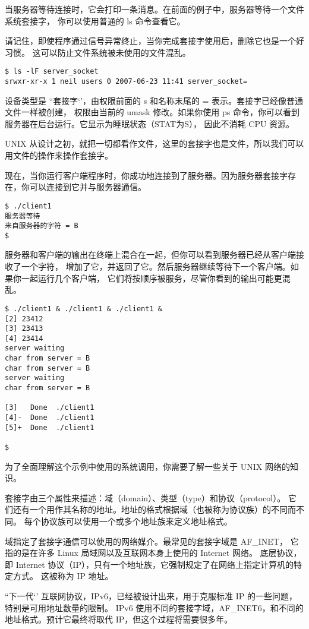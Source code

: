 \documentclass{ctexart}
\begin{document}
当服务器等待连接时，它会打印一条消息。在前面的例子中，服务器等待一个文件系统套接字，
你可以使用普通的 ls 命令查看它。  
  
请记住，即使程序通过信号异常终止，当你完成套接字使用后，删除它也是一个好习惯。
这可以防止文件系统被未使用的文件混乱。  
\begin{verbatim}  
$ ls -lF server_socket  
srwxr-xr-x 1 neil users 0 2007-06-23 11:41 server_socket=  
\end{verbatim}  

设备类型是 ``套接字‘’，由权限前面的 s 和名称末尾的 = 表示。套接字已经像普通文件一样被创建，
权限由当前的 umask 修改。如果你使用 ps 命令，你可以看到服务器在后台运行。它显示为睡眠状态（STAT为S），
因此不消耗 CPU 资源。 

UNIX 从设计之初，就把一切都看作文件，这里的套接字也是文件，所以我们可以用文件的操作来操作套接字。

现在，当你运行客户端程序时，你成功地连接到了服务器。因为服务器套接字存在，你可以连接到它并与服务器通信。  
\begin{verbatim}  
$ ./client1  
服务器等待  
来自服务器的字符 = B  
$  
\end{verbatim}  
服务器和客户端的输出在终端上混合在一起，但你可以看到服务器已经从客户端接收了一个字符，
增加了它，并返回了它。然后服务器继续等待下一个客户端。如果你一起运行几个客户端，
它们将按顺序被服务，尽管你看到的输出可能更混乱。  
\begin{verbatim}  
$ ./client1 & ./client1 & ./client1 &  
[2] 23412  
[3] 23413  
[4] 23414  
server waiting
char from server = B
char from server = B
server waiting
char from server = B

[3]   Done  ./client1
[4]-  Done  ./client1
[5]+  Done  ./client1

$   
\end{verbatim}  

为了全面理解这个示例中使用的系统调用，你需要了解一些关于 UNIX 网络的知识。  
  
套接字由三个属性来描述：域（domain）、类型（type）和协议（protocol）。
它们还有一个用作其名称的地址。地址的格式根据域（也被称为协议族）的不同而不同。
每个协议族可以使用一个或多个地址族来定义地址格式。  

域指定了套接字通信可以使用的网络媒介。最常见的套接字域是 AF\_INET，
它指的是在许多 Linux 局域网以及互联网本身上使用的 Internet 网络。
底层协议，即 Internet 协议（IP），只有一个地址族，它强制规定了在网络上指定计算机的特定方式。
这被称为 IP 地址。  
  
``下一代‘’ 互联网协议，IPv6，已经被设计出来，用于克服标准 IP 的一些问题，特别是可用地址数量的限制。
IPv6 使用不同的套接字域，AF\_INET6，和不同的地址格式。预计它最终将取代 IP，但这个过程将需要很多年。
\end{document}
